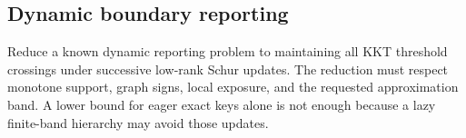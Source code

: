 \subsection{Dynamic boundary reporting}

Reduce a known dynamic reporting problem to maintaining all KKT threshold
crossings under successive low-rank Schur updates.  The reduction must respect
monotone support, graph signs, local exposure, and the requested approximation
band.  A lower bound for eager exact keys alone is not enough because a lazy
finite-band hierarchy may avoid those updates.
